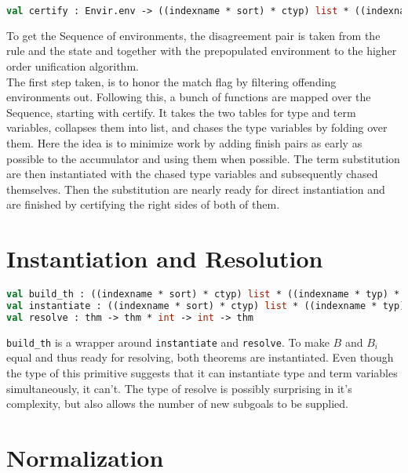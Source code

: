 \begin{lstlisting}[language=ML,breaklines=true]
val certify : Envir.env -> ((indexname * sort) * ctyp) list * ((indexname * typ) * cterm) list
\end{lstlisting}

To get the Sequence of environments, the disagreement pair is taken from the rule and the state and together with the prepopulated environment to the higher order unification algorithm.\\
The first step taken, is to honor the match flag by filtering offending environments out. Following this, a bunch of functions are mapped over the Sequence, starting with certify. It takes the two tables for type and term variables, collapses them into list, and chases the type variables by folding over them. Here the idea is to minimize work by adding finish pairs as early as possible to the accumulator and using them when possible. The term substitution are then instantiated with the chased type variables and subsequently chased themselves. Then the substitution are nearly ready for direct instantiation and are finished by certifying the right sides of both of them.\\

\section{Instantiation and Resolution}

\begin{lstlisting}[language=ML,breaklines=true]
val build_th : ((indexname * sort) * ctyp) list * ((indexname * typ) * cterm) list -> thm
val instantiate : ((indexname * sort) * ctyp) list * ((indexname * typ) * cterm) list
val resolve : thm -> thm * int -> int -> thm
\end{lstlisting}

\texttt{build\_th} is a wrapper around \texttt{instantiate} and \texttt{resolve}. To make $B$ and $B_i$ equal and thus ready for resolving, both theorems are instantiated. Even though the type of this primitive suggests that it can instantiate type and term variables simultaneously, it can't. The type of resolve is possibly surprising in it's complexity, but also allows the number of new subgoals to be supplied.\\

\section{Normalization}

